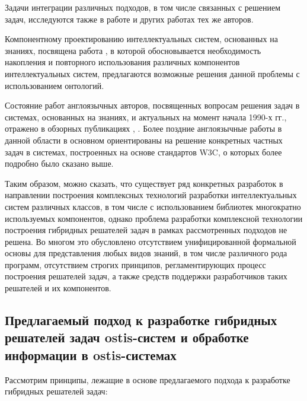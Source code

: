 Задачи интеграции различных подходов, в том числе связанных с решением задач, исследуются также в работе  и других работах тех же авторов.

Компонентному проектированию интеллектуальных систем, основанных на знаниях, посвящена работа , в которой обосновывается необходимость накопления и повторного использования различных компонентов интеллектуальных систем, предлагаются возможные решения данной проблемы с использованием онтологий.

Состояние работ англоязычных авторов, посвященных вопросам решения задач в системах, основанных на знаниях, и актуальных на момент начала 1990-х гг., отражено в обзорных публикациях , . Более поздние англоязычные работы в данной области в основном ориентированы на решение конкретных частных задач в системах, построенных на основе стандартов W3C, о которых более подробно было сказано выше.

Таким образом, можно сказать, что существует ряд конкретных разработок в направлении построения комплексных технологий разработки интеллектуальных систем различных классов, в том числе с использованием библиотек многократно используемых компонентов, однако проблема разработки комплексной технологии построения гибридных решателей задач в рамках рассмотренных подходов не решена. Во многом это обусловлено отсутствием унифицированной формальной основы для представления любых видов знаний, в том числе различного рода программ, отсутствием строгих принципов, регламентирующих процесс построения решателей задач, а также средств поддержки разработчиков таких решателей и их компонентов.

\subsection{Предлагаемый подход к разработке гибридных решателей задач ostis-систем и обработке информации в ostis-системах}

Рассмотрим принципы, лежащие в основе предлагаемого подхода к разработке гибридных решателей задач:


